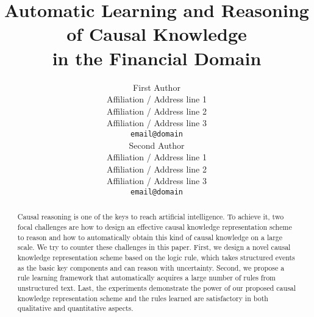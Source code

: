 \documentclass[11pt,a4paper]{article}
\title{Automatic Learning and Reasoning of Causal Knowledge \\ in the Financial Domain}
\author{First Author \\
	Affiliation / Address line 1 \\
	Affiliation / Address line 2 \\
	Affiliation / Address line 3 \\
	{\tt email@domain} \\\And
	Second Author \\
	Affiliation / Address line 1 \\
	Affiliation / Address line 2 \\
	Affiliation / Address line 3 \\
	{\tt email@domain} \\}
\date{}
\begin{document}
	\maketitle
	\begin{abstract}
	Causal reasoning is one of the keys to reach artificial intelligence. 
	To achieve it, two focal challenges are how to design an effective causal knowledge representation scheme to reason and how to automatically obtain this kind of causal knowledge on a large scale. 
	We try to counter these challenges in this paper. First, we design a novel causal knowledge representation scheme based on the logic rule, which takes structured events as the basic key components and can reason with uncertainty.
	Second, we propose a rule learning framework that automatically acquires a large number of rules from unstructured text. 
	Last, the experiments demonstrate the power of our proposed causal knowledge representation scheme and the rules learned are satisfactory in both qualitative and quantitative aspects.
	\end{abstract}
\begin{CJK}{UTF8}{gkai}
	
	
	
	
	\clearpage
	
	
\end{CJK}
\end{document}
